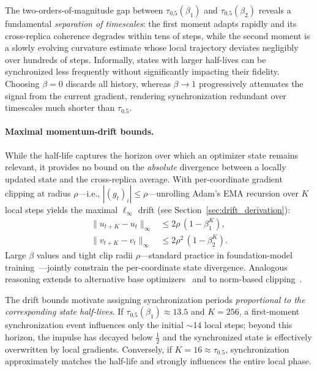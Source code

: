 \documentclass{article}
\begin{document}
The two-orders-of-magnitude gap between $\tau_{0.5}(\beta_1)$ and
$\tau_{0.5}(\beta_2)$ reveals a fundamental \emph{separation of timescales}:
the first moment adapts rapidly and its cross-replica coherence degrades
within tens of steps, while the second moment is a slowly evolving curvature
estimate whose local trajectory deviates negligibly over hundreds of steps.
Informally, states with larger half-lives can be synchronized less frequently
without significantly impacting their fidelity. Choosing $\beta = 0$ discards
all history, whereas $\beta \to 1$ progressively attenuates the signal from the
current gradient, rendering synchronization redundant over timescales much
shorter than $\tau_{0.5}$.

\paragraph{Maximal momentum-drift bounds.}
While the half-life captures the horizon over which an optimizer state
remains relevant, it provides no bound on the \emph{absolute} divergence
between a locally updated state and the cross-replica average. With
per-coordinate gradient clipping at radius $\rho$---i.e.,
$|(g_t)_i| \leq \rho$---unrolling Adam's EMA recursion over $K$ local steps yields
the maximal $\ell_\infty$ drift (see Section~\ref{sec:drift_derivation}):
\begin{align}
\|u_{t+K} - u_t\|_\infty &\leq 2\rho\,(1 - \beta_1^K), \label{eq:drift_u} \\
\|v_{t+K} - v_t\|_\infty &\leq 2\rho^2\,(1 - \beta_2^K). \label{eq:drift_v}
\end{align}
Large $\beta$ values and tight clip radii $\rho$---standard practice in
foundation-model training~\citep{brown2020language,scao2022bloom}---jointly
constrain the per-coordinate state divergence.
Analogous reasoning extends to alternative base
optimizers~\citep{sutskever2013importance,taniguchi2024adopt} and to
norm-based clipping~\citep{pascanu2013difficulty,brown2020language}.

The drift bounds motivate assigning synchronization periods
\emph{proportional to the corresponding state half-lives}.
If $\tau_{0.5}(\beta_1) \approx 13.5$ and $K = 256$, a first-moment
synchronization event influences only the initial $\sim$14 local steps;
beyond this horizon, the impulse has decayed below $\tfrac{1}{2}$ and the
synchronized state is effectively overwritten by local gradients.
Conversely, if $K = 16 \approx \tau_{0.5}$, synchronization approximately
matches the half-life and strongly influences the entire local phase.
\end{document}
